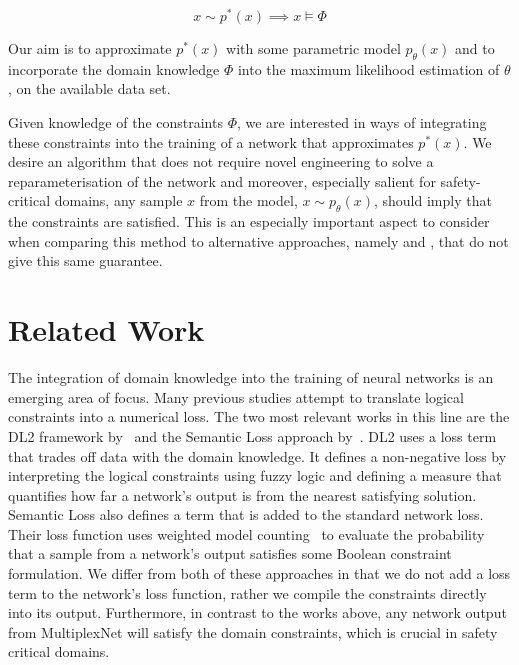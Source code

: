 \documentclass[letterpaper]{article} %
\begin{document}
\begin{equation}
    \label{eq:domain_constraints}
    x \sim p^*(x) \implies x \models \Phi
\end{equation}


Our aim is to approximate $p^*(x)$ with some parametric model $p_\theta(x)$ and to incorporate the domain knowledge $\Phi$ into the maximum likelihood estimation of $\theta$, on the available data set.

Given knowledge of the constraints $\Phi$, we are interested in ways of integrating these constraints into the training of a network that approximates $p^*(x)$.
We desire an algorithm that does not require novel engineering to solve a reparameterisation of the network and moreover, especially salient for safety-critical domains, any sample $x$ from the model, $x \sim p_\theta(x)$, should imply that the constraints are satisfied.
This is an especially important aspect to consider when comparing this method to alternative approaches, namely \citet{fischer2018dl2} and \citet{xu2017semantic}, that do not give this same guarantee. 


\section{Related Work}

The integration of domain knowledge into the training of neural networks is an emerging area of focus. 
Many previous studies attempt to translate logical constraints into a numerical loss. 
The two most relevant works in this line are the DL2 framework by~\citet{fischer2018dl2} and the Semantic Loss approach by~\citet{xu2017semantic}.
DL2 uses a loss term that trades off data with the domain knowledge. 
It defines a non-negative loss by interpreting the logical constraints using fuzzy logic and defining a measure that quantifies how far a network's output is from the nearest satisfying solution. 
Semantic Loss also defines a term that is added to the standard network loss.
Their loss function uses weighted model counting~\citep{chavira2008probabilistic} to evaluate the probability that a sample from a network's output satisfies some Boolean constraint formulation. 
We differ from both of these approaches in that we do not add a loss term to the network's loss function, rather we compile the constraints directly into its output. 
Furthermore, in contrast to the works above, any network output from MultiplexNet will satisfy the domain constraints, which is crucial in safety critical domains. 
\end{document}
